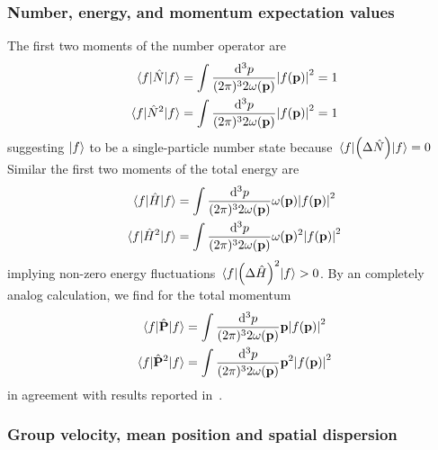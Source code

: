 \subsubsection{Number, energy, and momentum expectation values}

The first two moments of the number operator are
\begin{align}
	\expval{\hat{N}}{f}
	&=
	\int\frac{\dd[3]{p}}{(2\pi)^32\omega(\vb{p})}
	\abs{f(\vb{p})}^2
	=
	1
	\\
	\expval{\hat{N}^2}{f}
	&=
	\int\frac{\dd[3]{p}}{(2\pi)^32\omega(\vb{p})}
	\abs{f(\vb{p})}^2
	=
	1
\end{align}
suggesting $\ket{f}$ to be a single-particle number state because $\expval{\left(\Delta\hat{N}\right)}{f}=0$
Similar the first two moments of the total energy are
\begin{align}
	\expval{\hat{H}}{f}
	&=
	\int\frac{\dd[3]{p}}{(2\pi)^32\omega(\vb{p})}
	\omega(\vb{p})
	\abs{f(\vb{p})}^2
	\\
	\expval{\hat{H}^2}{f}
	&=
	\int\frac{\dd[3]{p}}{(2\pi)^32\omega(\vb{p})}
	\omega(\vb{p})^2
	\abs{f(\vb{p})}^2
\end{align}
implying non-zero energy fluctuations $\expval{\left(\Delta\hat{H}\right)^2}{f}>0$.
By an completely analog calculation, we find for the total momentum
\begin{align}
	\expval{\hat{\vb{P}}}{f}
	&=
	\int\frac{\dd[3]{p}}{(2\pi)^32\omega(\vb{p})}
	\vb{p}
	\abs{f(\vb{p})}^2
	\\
	\expval{\hat{\vb{P}}^2}{f}
	&=
	\int\frac{\dd[3]{p}}{(2\pi)^32\omega(\vb{p})}
	\vb{p}^2
	\abs{f(\vb{p})}^2
\end{align}
in agreement with results reported in~\cite[eqs.~10 and 11]{Naumov2013}.

\subsubsection{Group velocity, mean position and spatial dispersion}

